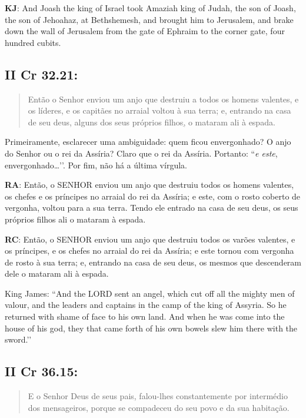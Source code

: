 \textbf{KJ}: And Joash the king of Israel took Amaziah king of Judah, the son of Joash, the son of Jehoahaz, at Bethshemesh, and brought him to Jerusalem, and brake down the wall of Jerusalem from the gate of Ephraim to the corner gate, four hundred cubits.

\subsection*{II Cr 32.21:} 
\begin{quote}
    \small
Então o Senhor enviou um anjo que destruiu a todos os homens valentes, e os líderes, e os capitães no arraial  voltou à sua terra; e, entrando na casa de seu deus, alguns dos seus próprios filhos\uline{,} o mataram ali à espada.
 \end{quote}

Primeiramente, esclarecer uma ambiguidade: quem ficou envergonhado? O
anjo do Senhor ou o rei da Assíria? Claro que o rei da Assíria.
Portanto: ``\emph{e este}, envergonhado\ldots’’. Por fim, não há a
última vírgula.

\textbf{RA}: Então, o SENHOR enviou um anjo que destruiu todos os homens valentes, os chefes e os príncipes no arraial do rei da Assíria; e este, com o rosto coberto de vergonha, voltou para a sua terra. Tendo ele entrado na casa de seu deus, os seus próprios filhos ali o mataram à espada.

\textbf{RC}: Então, o SENHOR enviou um anjo que destruiu todos os varões valentes, e os príncipes, e os chefes no arraial do rei da Assíria; e este tornou com vergonha de rosto à sua terra; e, entrando na casa de seu deus, os mesmos que descenderam dele o mataram ali à espada.

King James: ``And the LORD sent an angel, which cut off all the mighty men of valour, and the leaders and captains in the camp of the king of Assyria. So he returned with shame of face to his own land. And when he was come into the house of his god, they that came forth of his own bowels slew him there with the sword.’’

\subsection*{II Cr 36.15:} 
\begin{quote}
    \small
E o Senhor Deus de seus pais\uline{,} falou-lhes constantemente por intermédio dos mensageiros, porque se compadeceu do seu povo e da sua habitação.
\end{quote}
 
